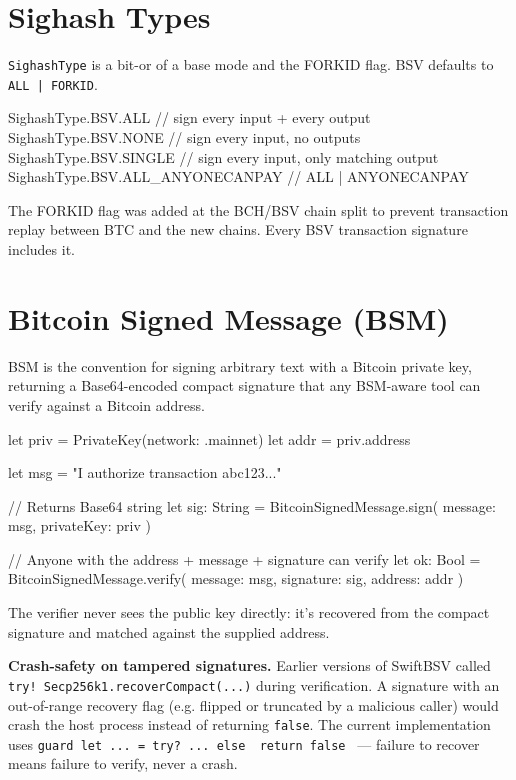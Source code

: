 \documentclass[a4paper, 11pt, openany]{book}
\begin{document}
\section{Sighash Types}

\texttt{SighashType} is a bit-or of a base mode and the FORKID flag. BSV defaults to \texttt{ALL | FORKID}.

\begin{forthbox}
SighashType.BSV.ALL                    // sign every input + every output
SighashType.BSV.NONE                   // sign every input, no outputs
SighashType.BSV.SINGLE                 // sign every input, only matching output
SighashType.BSV.ALL_ANYONECANPAY       // ALL | ANYONECANPAY
\end{forthbox}

The FORKID flag was added at the BCH/BSV chain split to prevent transaction replay between BTC and the new chains. Every BSV transaction signature includes it.

\section{Bitcoin Signed Message (BSM)}

BSM is the convention for signing arbitrary text with a Bitcoin private key, returning a Base64-encoded compact signature that any BSM-aware tool can verify against a Bitcoin address.

\begin{forthbox}[BitcoinSignedMessage]
let priv = PrivateKey(network: .mainnet)
let addr = priv.address

let msg = "I authorize transaction abc123..."

// Returns Base64 string
let sig: String = BitcoinSignedMessage.sign(
    message: msg,
    privateKey: priv
)

// Anyone with the address + message + signature can verify
let ok: Bool = BitcoinSignedMessage.verify(
    message: msg,
    signature: sig,
    address: addr
)
\end{forthbox}

The verifier never sees the public key directly: it's recovered from the compact signature and matched against the supplied address.

\begin{notebox}
\textbf{Crash-safety on tampered signatures.} Earlier versions of SwiftBSV called \texttt{try!\ Secp256k1.recoverCompact(...)} during verification. A signature with an out-of-range recovery flag (e.g. flipped or truncated by a malicious caller) would crash the host process instead of returning \texttt{false}. The current implementation uses \texttt{guard let ... = try?\ ... else { return false }} --- failure to recover means failure to verify, never a crash.
\end{notebox}
\end{document}
